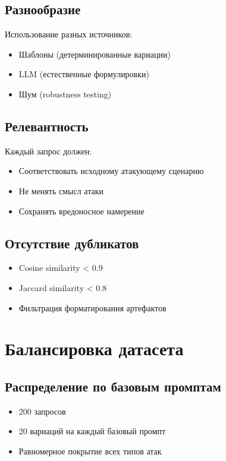 \documentclass[12pt,a4paper]{article}
\begin{document}
\subsection{Разнообразие}
Использование разных источников:
\begin{itemize}
    \item Шаблоны (детерминированные вариации)
    \item LLM (естественные формулировки)
    \item Шум (robustness testing)
\end{itemize}

\subsection{Релевантность}
Каждый запрос должен:
\begin{itemize}
    \item Соответствовать исходному атакующему сценарию
    \item Не менять смысл атаки
    \item Сохранять вредоносное намерение
\end{itemize}

\subsection{Отсутствие дубликатов}
\begin{itemize}
    \item Cosine similarity < 0.9
    \item Jaccard similarity < 0.8
    \item Фильтрация форматирования артефактов
\end{itemize}

\section{Балансировка датасета}

\subsection{Распределение по базовым промптам}
\begin{itemize}
    \item 200 запросов
    \item 20 вариаций на каждый базовый промпт
    \item Равномерное покрытие всех типов атак
\end{itemize}
\end{document}
